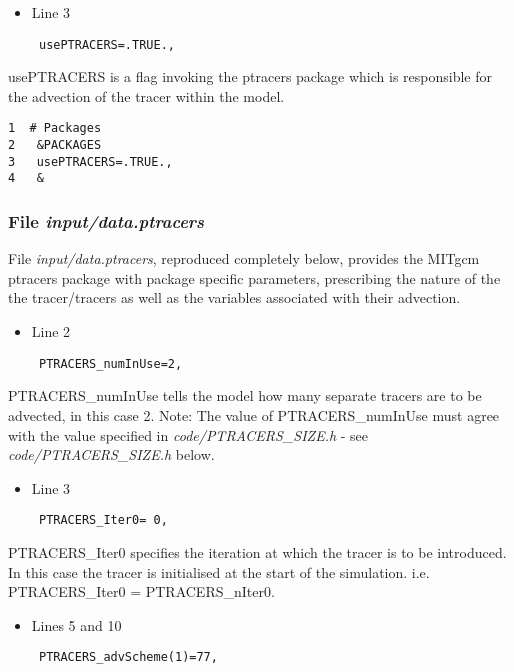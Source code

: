 \begin {itemize}
\item Line 3
\begin {verbatim}
 usePTRACERS=.TRUE.,
\end{verbatim}
\end{itemize}

\noindent usePTRACERS is a flag invoking the ptracers package which is
responsible for the advection of the tracer within the model.

\begin {verbatim}
1  # Packages
2   &PACKAGES
3   usePTRACERS=.TRUE.,
4   &
\end{verbatim}

\subsubsection{File {\it input/data.ptracers}}
\label{www:tutorials}

\noindent File {\it input/data.ptracers}, reproduced completely below,
provides the MITgcm ptracers package with package specific parameters,
prescribing the nature of the the tracer/tracers as well as the
variables associated with their advection.

\begin{itemize}
\item Line 2
\begin {verbatim}
 PTRACERS_numInUse=2,
\end{verbatim}
\end{itemize}

\noindent PTRACERS\_numInUse tells the model how many separate tracers
are to be advected, in this case 2. Note: The value of
PTRACERS\_numInUse must agree with the value specified in {\it
  code/PTRACERS\_SIZE.h} - see {\it code/PTRACERS\_SIZE.h} below.

\begin{itemize}
\item Line 3
\begin {verbatim}
 PTRACERS_Iter0= 0,
\end{verbatim}
\end{itemize}

\noindent PTRACERS\_Iter0 specifies the iteration at which the tracer
is to be introduced. In this case the tracer is initialised at the
start of the simulation. i.e. PTRACERS\_Iter0 = PTRACERS\_nIter0.

\begin{itemize}
\item Lines 5 and 10
\begin {verbatim}
 PTRACERS_advScheme(1)=77,
\end{verbatim}
\end{itemize}

